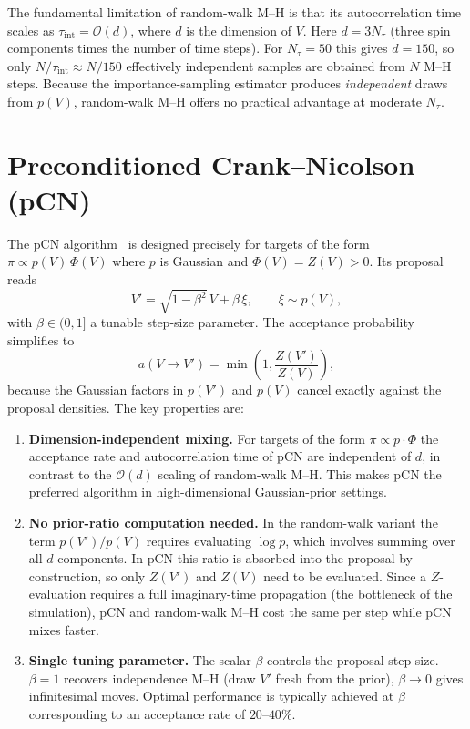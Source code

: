 \documentclass[11pt]{article}
\newcommand{\calO}{\mathcal{O}}
\begin{document}
The fundamental limitation of random-walk M--H is that its autocorrelation time
scales as $\tau_{\mathrm{int}} = \calO(d)$, where $d$ is the dimension of $V$.
Here $d = 3N_\tau$ (three spin components times the number of time steps).
For $N_\tau = 50$ this gives $d = 150$, so only $N/\tau_{\mathrm{int}} \approx N/150$
effectively independent samples are obtained from $N$ M--H steps.
Because the importance-sampling estimator produces \emph{independent} draws from
$p(V)$, random-walk M--H offers no practical advantage at moderate $N_\tau$.

\section{Preconditioned Crank--Nicolson (pCN)}

The pCN algorithm~\cite{Cotter2013} is designed precisely for targets of the form
$\pi \propto p(V)\,\Phi(V)$ where $p$ is Gaussian and $\Phi(V) = Z(V) > 0$.
Its proposal reads
\begin{equation}
    \boxed{V' = \sqrt{1-\beta^2}\,V + \beta\,\xi, \qquad \xi \sim p(V),}
    \label{eq:pCN}
\end{equation}
with $\beta\in(0,1]$ a tunable step-size parameter.
The acceptance probability simplifies to
\begin{equation}
    a(V\to V') = \min\!\left(1,\frac{Z(V')}{Z(V)}\right),
    \label{eq:accept}
\end{equation}
because the Gaussian factors in $p(V')$ and $p(V)$ cancel exactly against the
proposal densities.  The key properties are:

\begin{enumerate}
    \item \textbf{Dimension-independent mixing.}  For targets of the form
    $\pi \propto p \cdot \Phi$ the acceptance rate and autocorrelation time of
    pCN are independent of $d$, in contrast to the $\calO(d)$ scaling of
    random-walk M--H.  This makes pCN the preferred algorithm in high-dimensional
    Gaussian-prior settings.

    \item \textbf{No prior-ratio computation needed.}  In the random-walk variant
    the term $p(V')/p(V)$ requires evaluating $\log p$, which involves summing
    over all $d$ components.  In pCN this ratio is absorbed into the proposal by
    construction, so only $Z(V')$ and $Z(V)$ need to be evaluated.  Since a
    $Z$-evaluation requires a full imaginary-time propagation (the bottleneck of
    the simulation), pCN and random-walk M--H cost the same per step while pCN
    mixes faster.

    \item \textbf{Single tuning parameter.}  The scalar $\beta$ controls the
    proposal step size.  $\beta = 1$ recovers independence M--H (draw $V'$
    fresh from the prior), $\beta \to 0$ gives infinitesimal moves.  Optimal
    performance is typically achieved at $\beta$ corresponding to an acceptance
    rate of $20$--$40\%$.
\end{enumerate}
\end{document}
